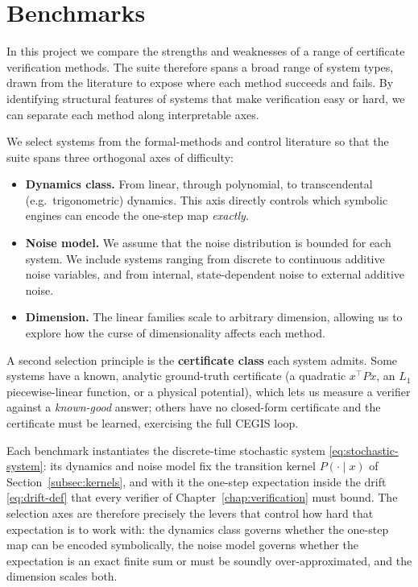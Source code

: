 \normallinespacing

\chapter{Benchmarks}
\label{chap:benchmarks}

In this project we compare the strengths and weaknesses of a range of
certificate verification methods. The suite therefore spans a broad range of
system types, drawn from the literature to expose where each method succeeds and
fails. By identifying structural features of systems that make verification easy
or hard, we can separate each method along interpretable axes.

We select systems from the formal-methods and control literature so that the
suite spans three orthogonal axes of difficulty:

\begin{itemize}
  \item \textbf{Dynamics class.} From linear, through polynomial, to
        transcendental (e.g.\ trigonometric) dynamics. This axis directly controls
        which symbolic engines can encode the one-step map \emph{exactly}.
  \item \textbf{Noise model.} We assume that the noise distribution is bounded for each system.
        We include systems ranging from discrete to continuous additive noise variables,
        and from internal, state-dependent noise to external additive noise.
  \item \textbf{Dimension.} The linear families scale to arbitrary dimension,
        allowing us to explore how the curse of dimensionality affects each method.
\end{itemize}

A second selection principle is the \textbf{certificate class} each system
admits. Some systems have a known, analytic ground-truth certificate (a
quadratic $x^\top P x$, an $L_1$ piecewise-linear function, or a physical
potential), which lets us measure a verifier against a \emph{known-good} answer;
others have no closed-form certificate and the certificate must be learned,
exercising the full CEGIS loop.

Each benchmark instantiates the discrete-time stochastic system
\eqref{eq:stochastic-system}: its dynamics and noise model fix the transition
kernel $P(\cdot \mid x)$ of Section~\ref{subsec:kernels}, and with it the
one-step expectation inside the drift \eqref{eq:drift-def} that every verifier
of Chapter~\ref{chap:verification} must bound. The selection axes are therefore
precisely the levers that control how hard that expectation is to work with:
the dynamics class governs whether the one-step map can be encoded symbolically, the
noise model governs whether the expectation is an exact finite sum or must be
soundly over-approximated, and the dimension scales both.

